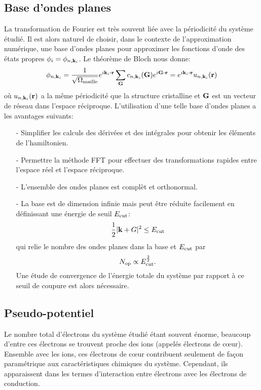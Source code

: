 \subsection{Base d'ondes planes}
\label{subsec-planewave}
La transformation de Fourier est très souvent liée avec la périodicité du système étudié.
Il est alors naturel de choisir, dans le contexte de l'approximation numérique,
une base d'ondes planes pour approximer les fonctions d'onde des états propres $\phi_i = \phi_{n,\vb{k}_i}$.
Le théorème de Bloch nous donne:
\begin{equation*}
  \phi_{n,\vb{k}_i}
  = \frac{1}{\sqrt{\Omega_{\V{maille}}}}e^{i\vb{k}_i\vdot\vb{r}}\sum_{\vb{G}} c_{n,\vb{k}_i}(\vb{G})e^{i\vb{G}\vdot\vb{r}}
  = e^{i\vb{k}_i\vdot\vb{r}} u_{n,\vb{k}_i}(\vb{r})
\end{equation*}
où $u_{n,\vb{k}_i}(\vb{r})$ a la même périodicité que la structure cristalline
et $\vb{G}$ est un vecteur de réseau dans l'espace réciproque.
L'utilisation d'une telle base d'ondes planes a les avantages suivants:
\begin{itemize}
  \item[-] Simplifier les calculs des dérivées et des intégrales pour obtenir les éléments de l'hamiltonien.
  \item[-] Permettre la méthode FFT pour effectuer des transformations rapides entre l'espace réel et l'espace réciproque.
  \item[-] L'ensemble des ondes planes est complèt et orthonormal.
  \item[-] La base est de dimension infinie mais peut être réduite facilement
    en définissant une énergie de seuil $E_{\textnormal{cut}}$:
    \begin{equation}
      \frac{1}{2}|\vb{k}+G|^2 \leq E_{\textnormal{cut}}
    \end{equation}
    qui relie le nombre des ondes planes dans la base et $E_{\textnormal{cut}}$ par
    \begin{equation}
      N_{\textnormal{op}}\propto E_{\textnormal{cut}}^{\frac{3}{2}}.
    \end{equation}
    Une étude de convergence de l'énergie totale du système par rapport à ce seuil de coupure est alors nécessaire.
\end{itemize}

\subsection{Pseudo-potentiel}
\label{subsec-pseudo}
Le nombre total d'électrons du système étudié étant souvent énorme,
beaucoup d'entre ces électrons se trouvent proche des ions (appelés électrons de cœur).
Ensemble avec les ions, ces électrons de cœur contribuent seulement de façon paramétrique
aux caractéristiques chimiques du système.
Cependant, ils apparaissent dans les termes d'interaction entre électrons avec les électrons de conduction.

